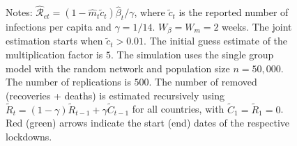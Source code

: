 \documentclass[12pt]{article}
\begin{document}
\begin{figure}[htp]
\begin{footnotesize}
\begin{center}
\begin{tabular}
{\includegraphics[
height=1.9951in,
width=2.6524in
]%
{figs/Italy_ER_N50000_guess5_2W_Re.png}%
}
\\
&  & \\
Spain &  & UK\\%
{\includegraphics[
height=1.9951in,
width=2.6524in
]%
{figs/Spain_ER_N50000_guess5_2W_Re.png}%
}
&  &
{\includegraphics[
height=1.9951in,
width=2.6524in
]%
{figs/UK_ER_N50000_guess5_2W_Re.png}%
}
\end{tabular}



\end{center}

%

\vspace{0cm}%
\footnotesize
Notes: $\mathcal{\hat{R}}_{et}=\left(  1-\hat{m}_{t}\tilde{c}_{t}\right)
\hat{\beta}_{t}/\gamma$, where $\tilde{c}_{t}$ is the reported number of
infections per capita and $\gamma=1/14$. $W_{\beta}=W_{m}=2$ weeks. The joint
estimation starts when $\tilde{c}_{t}>0.01$. The initial guess estimate of the
multiplication factor is $5$. The simulation uses the single group model with
the random network and population size $n=50,000$. The number of replications
is $500$. The number of removed (recoveries + deaths) is estimated recursively
using $\tilde{R}_{t}=\left(  1-\gamma\right)  \tilde{R}_{t-1}+\gamma\tilde
{C}_{t-1}$ for all countries, with $\tilde{C}_{1}=\tilde{R}_{1}=0$. Red
(green) arrows indicate the start (end) dates of the respective lockdowns.%


\end{footnotesize}
\end{figure}
\end{document}

